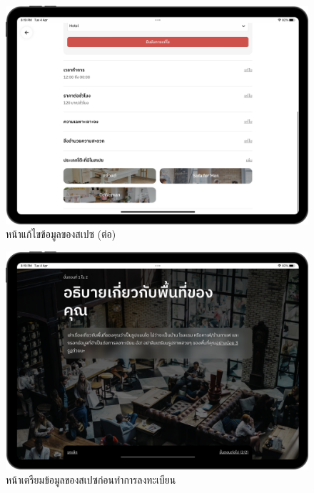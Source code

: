 \begin{figure}[ht]
    \begin{center}
    \includegraphics[width=5.5in]{./image/Flowider_space_edit_2.png}
    \end{center}
    \caption[Flowider space edit 2]{หน้าแก้ไขข้อมูลของสเปซ (ต่อ)}
    \label{fig:Flowider_space_edit_2}
\end{figure}
\begin{figure}[ht]
    \begin{center}
    \includegraphics[width=5.5in]{./image/Flowider_onboarding_1.png}
    \end{center}
    \caption[Flowider onboarding 1]{หน้าเตรียมข้อมูลของสเปซก่อนทำการลงทะเบียน}
    \label{fig:Flowider_onboarding_1}
\end{figure}
